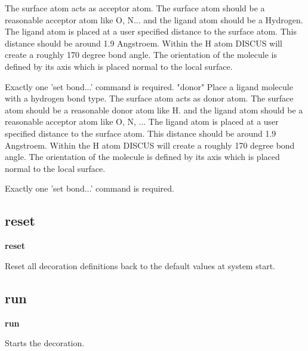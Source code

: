            The surface atom acts as acceptor atom. The surface atom should 
           be a reasonable acceptor atom like O, N... and the ligand atom 
           should be a Hydrogen. 
           The ligand atom is placed at a user specified distance to the 
           surface atom. This distance should be around 1.9  Angstroem. 
           Within the H atom DISCUS will create a roughly 170 degree bond 
           angle. 
           The orientation of the molecule is defined by its axis which is 
           placed normal to the local surface. 
\par
           Exactly one 'set bond...' command is required. 
"donor"    Place a ligand molecule with a hydrogen bond type. 
           The surface atom acts as donor atom. The surface atom should 
           be a reasonable donor atom like H. and the ligand atom 
           should be a reasonable acceptor atom like O, N, ... 
           The ligand atom is placed at a user specified distance to the 
           surface atom. This distance should be around 1.9  Angstroem. 
           Within the H atom DISCUS will create a roughly 170 degree bond 
           angle. 
           The orientation of the molecule is defined by its axis which is 
           placed normal to the local surface. 
\par
           Exactly one 'set bond...' command is required. 
\par
\subsection*{reset}
{\bf reset \par }
\par
\vspace{3pt}
Reset all decoration definitions back to the default values at 
system start. 
\subsection*{run}
{\bf run \par }
\vspace{3pt}
Starts the decoration. 
